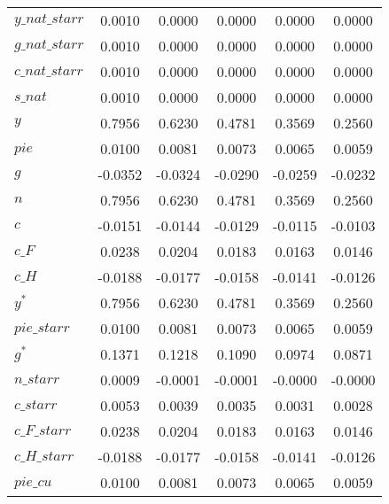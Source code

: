 \begin{center}
\begin{longtable}{lccccc}
$y\_nat\_starr  $	 & 	     0.0010	 & 	     0.0000	 & 	     0.0000	 & 	     0.0000	 & 	     0.0000 \\ 
$g\_nat\_starr  $	 & 	     0.0010	 & 	     0.0000	 & 	     0.0000	 & 	     0.0000	 & 	     0.0000 \\ 
$c\_nat\_starr  $	 & 	     0.0010	 & 	     0.0000	 & 	     0.0000	 & 	     0.0000	 & 	     0.0000 \\ 
$s\_nat         $	 & 	     0.0010	 & 	     0.0000	 & 	     0.0000	 & 	     0.0000	 & 	     0.0000 \\ 
${y}            $	 & 	     0.7956	 & 	     0.6230	 & 	     0.4781	 & 	     0.3569	 & 	     0.2560 \\ 
$pie            $	 & 	     0.0100	 & 	     0.0081	 & 	     0.0073	 & 	     0.0065	 & 	     0.0059 \\ 
${g}            $	 & 	    -0.0352	 & 	    -0.0324	 & 	    -0.0290	 & 	    -0.0259	 & 	    -0.0232 \\ 
$n              $	 & 	     0.7956	 & 	     0.6230	 & 	     0.4781	 & 	     0.3569	 & 	     0.2560 \\ 
$c              $	 & 	    -0.0151	 & 	    -0.0144	 & 	    -0.0129	 & 	    -0.0115	 & 	    -0.0103 \\ 
$c\_F           $	 & 	     0.0238	 & 	     0.0204	 & 	     0.0183	 & 	     0.0163	 & 	     0.0146 \\ 
$c\_H           $	 & 	    -0.0188	 & 	    -0.0177	 & 	    -0.0158	 & 	    -0.0141	 & 	    -0.0126 \\ 
${y^*}          $	 & 	     0.7956	 & 	     0.6230	 & 	     0.4781	 & 	     0.3569	 & 	     0.2560 \\ 
$pie\_starr     $	 & 	     0.0100	 & 	     0.0081	 & 	     0.0073	 & 	     0.0065	 & 	     0.0059 \\ 
${g^*}          $	 & 	     0.1371	 & 	     0.1218	 & 	     0.1090	 & 	     0.0974	 & 	     0.0871 \\ 
$n\_starr       $	 & 	     0.0009	 & 	    -0.0001	 & 	    -0.0001	 & 	    -0.0000	 & 	    -0.0000 \\ 
$c\_starr       $	 & 	     0.0053	 & 	     0.0039	 & 	     0.0035	 & 	     0.0031	 & 	     0.0028 \\ 
$c\_F\_starr    $	 & 	     0.0238	 & 	     0.0204	 & 	     0.0183	 & 	     0.0163	 & 	     0.0146 \\ 
$c\_H\_starr    $	 & 	    -0.0188	 & 	    -0.0177	 & 	    -0.0158	 & 	    -0.0141	 & 	    -0.0126 \\ 
$pie\_cu        $	 & 	     0.0100	 & 	     0.0081	 & 	     0.0073	 & 	     0.0065	 & 	     0.0059 \\ 

\end{longtable}
\end{center}
